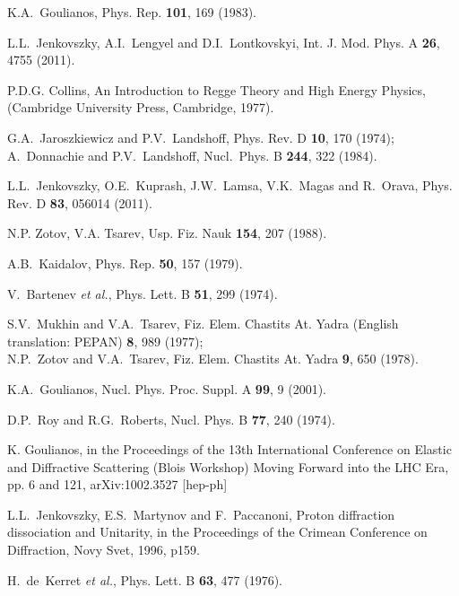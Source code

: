 \documentclass[12pt]{article}
\begin{document}
\begin{thebibliography}{9}
  K.A.~Goulianos,  Phys. Rep. {\bf101}, 169 (1983).
    
  L.L.~Jenkovszky, A.I.~Lengyel and D.I.~Lontkovskyi,  Int. J. Mod. Phys.  A {\bf26}, 4755 (2011).%

P.D.G. Collins, An Introduction to Regge Theory and High Energy Physics, (Cambridge University Press, Cambridge, 1977).

  G.A.~Jaroszkiewicz and P.V.~Landshoff,  Phys. Rev. D {\bf10}, 170 (1974);\\ 
  A.~Donnachie and P.V.~Landshoff,  Nucl.~Phys. B {\bf244}, 322 (1984).

  L.L.~Jenkovszky, O.E.~Kuprash, J.W.~Lamsa, V.K.~Magas and R.~Orava,  Phys. Rev. D {\bf 83}, 056014 (2011).%
  
N.P. Zotov, V.A. Tsarev, Usp. Fiz. Nauk {\bf 154}, 207 (1988).

  A.B.~Kaidalov,  Phys. Rep.  {\bf 50}, 157 (1979).
  
  V.~Bartenev %
  {\it et al.},  Phys. Lett. B {\bf51}, 299 (1974).
  
  S.V.~Mukhin and V.A.~Tsarev,  Fiz. Elem. Chastits At. Yadra (English translation: PEPAN)
  {\bf 8}, 989 (1977);\\
  N.P.~Zotov and V.A.~Tsarev,  Fiz. Elem. Chastits At. Yadra {\bf 9}, 650 (1978).

 K.A.~Goulianos,  Nucl. Phys. Proc. Suppl. A {\bf99}, 9 (2001).%
  
  D.P.~Roy and R.G.~Roberts,
  Nucl. Phys. B {\bf77}, 240 (1974).

K. Goulianos, in the Proceedings of the 13th International Conference on Elastic and Diffractive Scattering (Blois Workshop) Moving Forward into the LHC Era, pp. 6 and 121, arXiv:1002.3527 [hep-ph]
  
 L.L.~Jenkovszky, E.S.~Martynov and F.~Paccanoni,
   Proton diffraction dissociation and Unitarity, 
  in the Proceedings of the Crimean Conference on Diffraction, Novy Svet, 1996, p159.

  H.~de~Kerret %
  {\it et al.},  Phys. Lett. B {\bf63}, 477 (1976).
  

\end{thebibliography}
\end{document}
